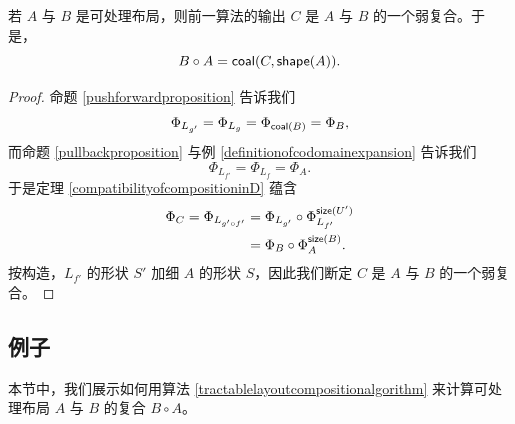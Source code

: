\begin{theorem}
    若 $A$ 与 $B$ 是可处理布局，则前一算法的输出 $C$ 是 $A$ 与 $B$ 的一个弱复合。于是，
    \[
    B \circ A = \mathsf{coal}(C,\mathsf{shape}(A)).
    \]
\end{theorem}

\begin{proof}
    命题 \ref{pushforwardproposition} 告诉我们
    \[\Phi_{L_{g'}} = \Phi_{L_g} = \Phi_{\mathsf{coal}(B)} = \Phi_B,\]
    而命题 \ref{pullbackproposition} 与例 \ref{definitionofcodomainexpansion} 告诉我们
    \[\Phi_{L_{f'}} = \Phi_{L_f}  = \Phi_A.\]
    于是定理 \ref{compatibilityofcompositioninD} 蕴含
    \begin{align*}
    \Phi_C = \Phi_{L_{g' \circ f'}} & = \Phi_{L_{g'}} \circ \Phi_{L_{f'}}^{\mathsf{size}(U')}\\
    & = \Phi_B \circ \Phi_A^{\mathsf{size}(B)}.
    \end{align*}
    按构造，$L_{f'}$ 的形状 $S'$ 加细 $A$ 的形状 $S$，因此我们断定 $C$ 是 $A$ 与 $B$ 的一个弱复合。
\end{proof}






\subsection{例子}

本节中，我们展示如何用算法 \ref{tractablelayoutcompositionalgorithm} 来计算可处理布局 $A$ 与 $B$ 的复合 $B \circ A$。

